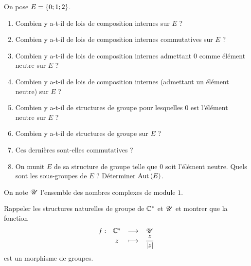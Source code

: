 \begin{exo}
On pose \(E=\left\lbrace0;1;2\right\rbrace\).

\begin{enumerate}
\item Combien y a-t-il de lois de composition internes sur \(E\) ? \\

\item Combien y a-t-il de lois de composition internes commutatives sur \(E\) ? \\

\item Combien y a-t-il de lois de composition internes admettant \(0\) comme élément neutre sur \(E\) ? \\

\item Combien y a-t-il de lois de composition internes  (\cad admettant un élément neutre) sur \(E\) ? \\

\item Combien y a-t-il de structures de groupe pour lesquelles \(0\) est l'élément neutre sur \(E\) ? \\

\item Combien y a-t-il de structures de groupe sur \(E\) ? \\

\item Ces dernières sont-elles commutatives ? \\

\item On munit \(E\) de sa structure de groupe telle que \(0\) soit l'élément neutre. Quels sont les sous-groupes de \(E\) ? Déterminer \(\operatorname{Aut}\left(E\right)\).
\end{enumerate}
\end{exo}

\begin{corr}
\end{corr}

\begin{exo}
On note \(\mathscr{U}\) l'ensemble des nombres complexes de module \(1\).

Rappeler les structures naturelles de groupe de \(\mathbb{C}^*\) et \(\mathscr{U}\) et montrer que la fonction \[\begin{array}[t]{cccc}f : & \mathbb{C}^* & \longrightarrow & \mathscr{U} \\ & z & \longmapsto & \dfrac{z}{\left\lvert z\right\rvert}\end{array}\] est un morphisme de groupes.
\end{exo}

\begin{corr}
\end{corr}

